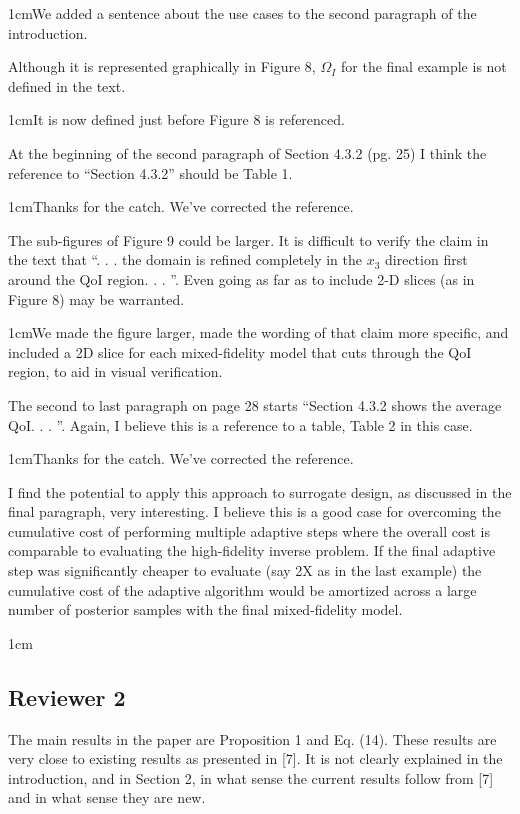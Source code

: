 \documentclass[12pt, letterpaper]{article}
\newcommand{\answer}[1]{\begin{adjustwidth}{1cm}{}{\color{blue}#1}\end{adjustwidth}}
\begin{document}
\answer{We added a sentence about the use cases to the second paragraph of the introduction.}

Although it is represented graphically in Figure 8, $\Omega_I$ for the final example is not defined in the text.

\answer{It is now defined just before Figure 8 is referenced.}

At the beginning of the second paragraph of Section 4.3.2 (pg. 25) I think the reference to “Section
4.3.2” should be Table 1.

\answer{Thanks for the catch. We've corrected the reference.}

The sub-figures of Figure 9 could be larger. It is difficult to verify the claim in the text that “. . . the
domain is refined completely in the $x_3$ direction first around the QoI region. . . ”. Even going as far as
to include 2-D slices (as in Figure 8) may be warranted.

\answer{We made the figure larger, made the wording of that claim more specific, and included a 2D slice for each mixed-fidelity model that cuts through the QoI region, to aid in visual verification.}

The second to last paragraph on page 28 starts “Section 4.3.2 shows the average QoI. . . ”. Again, I
believe this is a reference to a table, Table 2 in this case.

\answer{Thanks for the catch. We've corrected the reference.}

I find the potential to apply this approach to surrogate design, as discussed in the final paragraph, very
interesting. I believe this is a good case for overcoming the cumulative cost of performing multiple
adaptive steps where the overall cost is comparable to evaluating the high-fidelity inverse problem.
If the final adaptive step was significantly cheaper to evaluate (say 2X as in the last example) the
cumulative cost of the adaptive algorithm would be amortized across a large number of posterior
samples with the final mixed-fidelity model.

\answer{}


\subsection*{Reviewer 2}

The main results in the paper are Proposition 1 and Eq. (14). These results are very close to existing results as presented in [7]. It is not clearly explained in the introduction, and in Section 2, in what sense the current results follow from [7] and in what sense they are new. 
\end{document}
